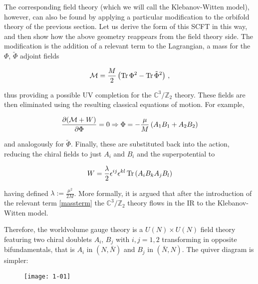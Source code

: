 The corresponding field theory (which we will call the Klebanov-Witten model), however, can also be found by applying a particular modification to the orbifold theory of the previous section\cite{KW_SCFT}. Let us derive the form of this SCFT in this way, and then show how the above geometry reappears from the field theory side. The modification is the addition of a relevant term to the Lagrangian, a mass for the $\Phi$, $\tilde\Phi$ adjoint fields

\begin{equation}
	\mathcal{M} = \frac{M}{2} \left( \operatorname{Tr} \Phi^2 - \operatorname{Tr} \tilde\Phi^2 \right)\,,
	\label{massterm}
\end{equation}

thus providing a possible UV completion for the $\mathbb{C}^3/\mathbb{Z}_2$ theory. These fields are then eliminated using the resulting classical equations of motion. For example,

\begin{equation}
	\frac{\partial(\mathcal{M} + W)}{\partial\Phi} = 0 \Rightarrow \Phi = - \frac{\mu}{M} \left( A_1 B_1 + A_2 B_2 \right)
	\label{}
\end{equation}

and analogously for $\tilde \Phi$. Finally, these are substituted back into the action, reducing the chiral fields to just $A_i$ and $B_i$ and the superpotential to

\begin{equation}
	W = \frac{\lambda}{2} \epsilon^{ij} \epsilon^{kl} \operatorname{Tr} \left( A_i B_k A_j B_l \right)
	\label{kwpotential}
\end{equation}

having defined $\lambda := \frac{\mu^2}{2M}$. More formally, it is argued that after the introduction of the relevant term \eqref{massterm} the $\mathbb{C}^3/\mathbb{Z}_2$ theory flows in the IR to the Klebanov-Witten model.

Therefore, the worldvolume gauge theory is a $U(N)\times U(N)$ field theory featuring two chiral doublets $A_i$, $B_j$ with $i,j = 1,2$ transforming in opposite bifundamentals, that is $A_i$ in $(N,\bar N)$ and $B_j$ in $(\bar N, N)$. The quiver diagram is simpler:

\begin{figure}[H]
	\centering
	\texttt{[image: 1-01]}
\end{figure}

